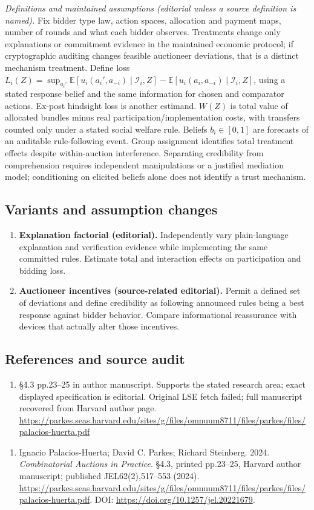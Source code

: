 \documentclass[11pt,a4paper]{article}
\begin{document}
\emph{Definitions and maintained assumptions (editorial unless a source definition is named).} Fix bidder type law, action spaces, allocation and payment maps, number of rounds and what each bidder observes. Treatments change only explanations or commitment evidence in the maintained economic protocol; if cryptographic auditing changes feasible auctioneer deviations, that is a distinct mechanism treatment. Define loss \(L_i(Z)=\sup_{a_i'}\mathbb E[u_i(a_i',a_{-i})\mid\mathcal I_i,Z]-\mathbb E[u_i(a_i,a_{-i})\mid\mathcal I_i,Z]\), using a stated response belief and the same information for chosen and comparator actions. Ex-post hindsight loss is another estimand. \(W(Z)\) is total value of allocated bundles minus real participation/implementation costs, with transfers counted only under a stated social welfare rule. Beliefs \(b_i\in[0,1]\) are forecasts of an auditable rule-following event. Group assignment identifies total treatment effects despite within-auction interference. Separating credibility from comprehension requires independent manipulations or a justified mediation model; conditioning on elicited beliefs alone does not identify a trust mechanism.
\subsection*{Variants and assumption changes}
\begin{enumerate}
\item \textbf{Explanation factorial (editorial).} Independently vary plain-language explanation and verification evidence while implementing the same committed rules. Estimate total and interaction effects on participation and bidding loss.
\item \textbf{Auctioneer incentives (source-related editorial).} Permit a defined set of deviations and define credibility as following announced rules being a best response against bidder behavior. Compare informational reassurance with devices that actually alter those incentives.
\end{enumerate}
\subsection*{References and source audit}
\begin{enumerate}
\item §4.3 pp.23–25 in author manuscript. Supports the stated research area; exact displayed specification is editorial. Original LSE fetch failed; full manuscript recovered from Harvard author page. \url{https://parkes.seas.harvard.edu/sites/g/files/omnuum8711/files/parkes/files/palacios-huerta.pdf}
\end{enumerate}
\begin{enumerate}\raggedright
\item\hypertarget{definitions:source:30007577:1}{} Ignacio Palacios-Huerta; David C. Parkes; Richard Steinberg. 2024. \emph{Combinatorial Auctions in Practice}. §4.3, printed pp.23–25, Harvard author manuscript; published JEL62(2),517–553 (2024).
\url{https://parkes.seas.harvard.edu/sites/g/files/omnuum8711/files/parkes/files/palacios-huerta.pdf}.
DOI: \url{https://doi.org/10.1257/jel.20221679}.
\end{enumerate}
\end{document}
